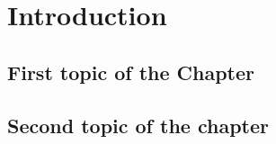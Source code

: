 
\chapter{Introduction}
\label{cha:introduction}

\section{First topic of the Chapter}

\section{Second topic of the chapter}
